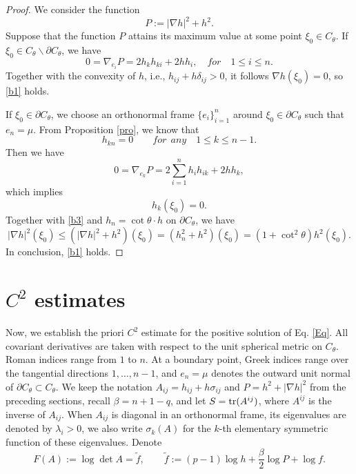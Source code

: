 \documentclass[11pt]{amsart}
\def\tr{{\rm tr}}
\numberwithin{equation} {section}
\numberwithin{equation}{section}
\begin{document}
\begin{proof}
    We consider the function
    $$P:= |\nabla h|^2 + h^2.$$
    Suppose that the function $P$  attains its maximum value at some point $\xi_{0}\in C_{\theta}$. If $\xi_0 \in C_{\theta}\backslash\partial C_{\theta}$, we have
    $$0=\nabla_{e_i}P = 2h_{k}h_{ki} + 2hh_{i}, \quad for \quad 1\leq i\leq n.$$
Together with the convexity of $h$, i.e., $h_{ij}+h\delta_{ij}>0$, it follows $\nabla h(\xi_{0})=0$, so \eqref{b1} holds.

If $\xi_{0}\in \partial C_{\theta}$, we choose an orthonormal frame $\{e_i\}_{i=1}^{n}$ around $\xi_{0}\in\partial C_{\theta}$ such that $e_n = \mu$. From Proposition \ref{pro}, we know that
\begin{equation}\label{b2}
    h_{kn}=0 \qquad for~~any \quad 1\leq k\leq n-1.
\end{equation}
Then we have
$$0=\nabla_{e_k}P = 2\sum_{i=1}^{n}h_{i}h_{ik}+ 2hh_{k},$$
which implies
\begin{equation}\label{b3}
    h_{k}(\xi_{0}) = 0.
\end{equation}
Together with \eqref{b3} and $h_n = \cot\theta\cdot h$ on $\partial C_{\theta}$, we have
$$|\nabla h|^2(\xi_{0})\leq (|\nabla h|^2 + h^2)(\xi_0) = (h_n^2 + h^2)(\xi_{0}) = (1+\cot^2\theta)h^2(\xi_0).$$
In conclusion, \eqref{b1} holds.
\end{proof}



\section{$C^2$ estimates} \label{se4}
Now, we establish the priori $C^2$ estimate for the positive solution of Eq. \eqref{Eq}. All covariant
derivatives are taken with respect to the unit spherical metric on $C_{\theta}$.
Roman indices range from $1$ to $n$. At a boundary point, Greek indices range
over the tangential directions $1,\ldots,n-1$, and $e_n=\mu$ denotes the outward
unit normal of $\partial C_{\theta}\subset C_{\theta}$. We keep the notation
$A_{ij}=h_{ij}+h\sigma_{ij}$ and $P=h^2+|\nabla h|^2$ from the preceding
sections, recall $\beta=n+1-q$, and let $ S=\tr(A^{ij})$, where $A^{ij}$ is the inverse of $A_{ij}$.
When $A_{ij}$ is diagonal in an orthonormal frame, its eigenvalues are denoted by
$\lambda_i>0$, we also write $\sigma_k(A)$ for the $k$-th elementary symmetric
function of these eigenvalues. Denote
\[
       F(A):= \log\det A=\tilde f,\qquad
        \tilde f:=(p-1)\log h+\frac{\beta}{2}\log P+\log f.
\]
\end{document}
